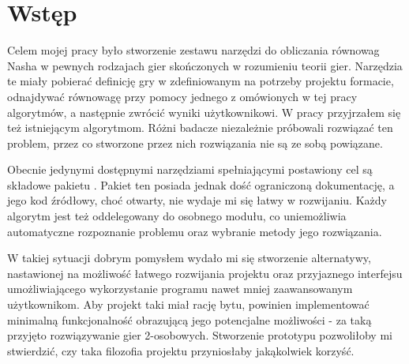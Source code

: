 \documentclass[polish]{standalone}
\begin{document}
\pagestyle{headings}

\section*{Wstęp}

Celem mojej pracy było stworzenie zestawu narzędzi do obliczania równowag Nasha w pewnych rodzajach gier skończonych
w rozumieniu teorii gier. Narzędzia te miały pobierać definicję gry w zdefiniowanym na potrzeby projektu formacie,
odnajdywać równowagę przy pomocy jednego z omówionych w tej pracy algorytmów, a następnie zwrócić wyniki użytkownikowi.
W pracy przyjrzałem się też istniejącym algorytmom. Różni badacze niezależnie próbowali rozwiązać ten problem, przez
co stworzone przez nich rozwiązania nie są ze sobą powiązane.

Obecnie jedynymi dostępnymi narzędziami spełniającymi postawiony cel są składowe pakietu . Pakiet ten
posiada jednak dość ograniczoną dokumentację, a jego kod źródłowy, choć otwarty, nie wydaje mi się łatwy w rozwijaniu.
Każdy algorytm jest też oddelegowany do osobnego modułu, co uniemożliwia automatyczne rozpoznanie problemu oraz
wybranie metody jego rozwiązania.

W takiej sytuacji dobrym pomysłem wydało mi się stworzenie alternatywy, nastawionej na możliwość łatwego rozwijania
projektu oraz przyjaznego interfejsu umożliwiającego wykorzystanie programu nawet mniej zaawansowanym użytkownikom. Aby
projekt taki miał rację bytu, powinien implementować minimalną funkcjonalność obrazującą jego potencjalne możliwości
- za taką przyjęto rozwiązywanie gier 2-osobowych. Stworzenie prototypu pozwoliłoby mi stwierdzić, czy taka filozofia
projektu przyniosłaby jakąkolwiek korzyść.
\end{document}
